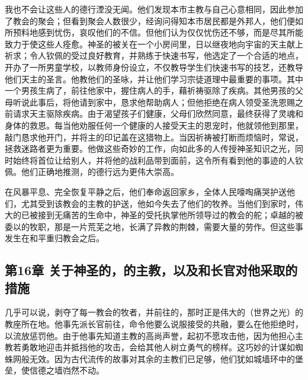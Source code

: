 我也不会让这些人的德行湮没无闻。他们发现本市主教与自己心意相同，因此参加了教会的聚会；但看到聚会人数很少，经询问得知本市居民都是外邦人，他们便如所预料地感到忧伤，哀叹他们的不信。但他们认为仅仅忧伤还不够，而是尽其所能致力于使这些人痊愈。神圣的被关在一个小房间里，日以继夜地向宇宙的天主献上祈求；令人钦佩的受过良好教育，并熟练于快速书写，他选定了一个合适的地点，开办了一所男童学校，以教师身份设立，不仅教导学生们快速书写的技艺，还教导他们天主的圣言。他教他们的圣咏，并让他们学习宗徒道理中最重要的事项。其中一个男孩生病了，前往他家中，握住病人的手，藉祈祷驱除了疾病。其他男孩的父母听说此事后，将他请到家中，恳求他帮助病人；但他拒绝在病人领受圣洗恩赐之前请求天主驱除疾病。由于渴望孩子们健康，父母们欣然同意，最终获得了灵魂和身体的救恩。每当他劝服任何一个健康的人接受天主的恩宠时，他就领他到那里，敲门恳求他开门，并将主的印记盖在这猎物上。当因祈祷被打断而烦恼时，常说，拯救迷路者更为重要。他做这些奇妙的工作，向如此多的人传授神圣知识之光，同时始终将首位让给别人，并将他的战利品带到面前，这令所有看到他的事迹的人钦佩。他们正确地推测，的德行远为更伟大崇高。\par

在风暴平息、完全恢复平静之后，他们奉命返回家乡，全体人民嚎啕痛哭护送他们，尤其受到该教会的主教的护送，他如今失去了他们的牧养。当他们到家时，伟大的已被接到无痛苦的生命中，神圣的受托执掌他所领导过的教会的舵；卓越的被委以的牧职，那是一片荒芜之地，长满了异教的荆棘，需要大量的劳作。但这些事发生在和平重归教会之后。\par


\subsection{第16章 关于神圣的，的主教，以及和长官对他采取的措施}

几乎可以说，剥夺了每一教会的牧者，并前往的，那时正是伟大的（世界之光）的教座所在地。他事先派长官前往，命令他要么说服接受的共融，要么在他拒绝时，以流放惩罚他。由于他事先知道主教的高尚声誉，起初不愿攻击他，因为他担心主教若勇敢地迎击并抵挡他的攻击，会给其他人树立勇气的榜样。这巧妙的计谋如蜘蛛网般无效。因为古代流传的故事对其余的主教们已足够，他们犹如城墙环中的堡垒，使信德之墙岿然不动。\par

